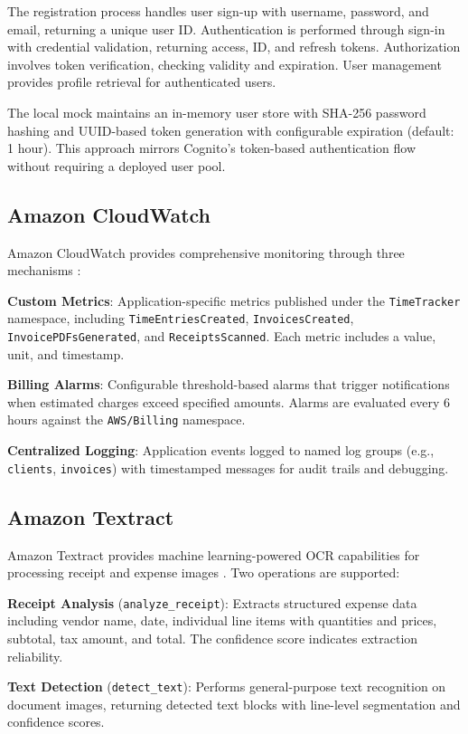\documentclass[conference]{IEEEtran}
\begin{document}
The registration process handles user sign-up with username, password, and email, returning a unique user ID. Authentication is performed through sign-in with credential validation, returning access, ID, and refresh tokens. Authorization involves token verification, checking validity and expiration. User management provides profile retrieval for authenticated users.

The local mock maintains an in-memory user store with SHA-256 password hashing and UUID-based token generation with configurable expiration (default: 1 hour). This approach mirrors Cognito's token-based authentication flow without requiring a deployed user pool.

\subsection{Amazon CloudWatch}

Amazon CloudWatch provides comprehensive monitoring through three mechanisms \cite{aws}:

\textbf{Custom Metrics}: Application-specific metrics published under the \texttt{TimeTracker} namespace, including \texttt{TimeEntriesCreated}, \texttt{InvoicesCreated}, \texttt{InvoicePDFsGenerated}, and \texttt{ReceiptsScanned}. Each metric includes a value, unit, and timestamp.

\textbf{Billing Alarms}: Configurable threshold-based alarms that trigger notifications when estimated charges exceed specified amounts. Alarms are evaluated every 6 hours against the \texttt{AWS/Billing} namespace.

\textbf{Centralized Logging}: Application events logged to named log groups (e.g., \texttt{clients}, \texttt{invoices}) with timestamped messages for audit trails and debugging.

\subsection{Amazon Textract}

Amazon Textract provides machine learning-powered OCR capabilities for processing receipt and expense images \cite{textract}. Two operations are supported:

\textbf{Receipt Analysis} (\texttt{analyze\_receipt}): Extracts structured expense data including vendor name, date, individual line items with quantities and prices, subtotal, tax amount, and total. The confidence score indicates extraction reliability.

\textbf{Text Detection} (\texttt{detect\_text}): Performs general-purpose text recognition on document images, returning detected text blocks with line-level segmentation and confidence scores.
\end{document}
